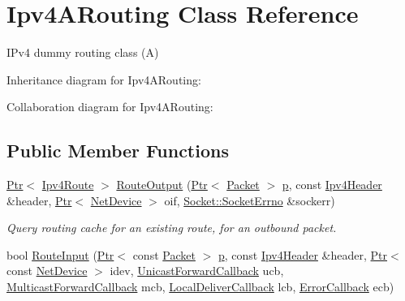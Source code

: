 \hypertarget{classIpv4ARouting}{}\section{Ipv4\+A\+Routing Class Reference}
\label{classIpv4ARouting}


I\+Pv4 dummy routing class (A)  




Inheritance diagram for Ipv4\+A\+Routing\+:


Collaboration diagram for Ipv4\+A\+Routing\+:
\subsection*{Public Member Functions}
\begin{DoxyCompactItemize}
\item 
\hyperlink{classns3_1_1Ptr}{Ptr}$<$ \hyperlink{classns3_1_1Ipv4Route}{Ipv4\+Route} $>$ \hyperlink{classIpv4ARouting_a13ea767139cc112214566ccb9862c412}{Route\+Output} (\hyperlink{classns3_1_1Ptr}{Ptr}$<$ \hyperlink{classns3_1_1Packet}{Packet} $>$ \hyperlink{lte__link__budget__x2__handover__measures_8m_ac9de518908a968428863f829398a4e62}{p}, const \hyperlink{classns3_1_1Ipv4Header}{Ipv4\+Header} \&header, \hyperlink{classns3_1_1Ptr}{Ptr}$<$ \hyperlink{classns3_1_1NetDevice}{Net\+Device} $>$ oif, \hyperlink{classns3_1_1Socket_ada1328c5ae0c28cb2a982caf8f6d6cca}{Socket\+::\+Socket\+Errno} \&sockerr)
\begin{DoxyCompactList}\small\item\em Query routing cache for an existing route, for an outbound packet. \end{DoxyCompactList}\item 
bool \hyperlink{classIpv4ARouting_a1cbe114fd34ed6681645ba469d52b8fe}{Route\+Input} (\hyperlink{classns3_1_1Ptr}{Ptr}$<$ const \hyperlink{classns3_1_1Packet}{Packet} $>$ \hyperlink{lte__link__budget__x2__handover__measures_8m_ac9de518908a968428863f829398a4e62}{p}, const \hyperlink{classns3_1_1Ipv4Header}{Ipv4\+Header} \&header, \hyperlink{classns3_1_1Ptr}{Ptr}$<$ const \hyperlink{classns3_1_1NetDevice}{Net\+Device} $>$ idev, \hyperlink{classns3_1_1Ipv4RoutingProtocol_a3453a85764cbbb1e704da7e919aa5d19}{Unicast\+Forward\+Callback} ucb, \hyperlink{classns3_1_1Ipv4RoutingProtocol_a26e76f7a555462e6c08fceda64a99d58}{Multicast\+Forward\+Callback} mcb, \hyperlink{classns3_1_1Ipv4RoutingProtocol_aa6ffa0159cb143daa3c46d2ba69bb1b9}{Local\+Deliver\+Callback} lcb, \hyperlink{classns3_1_1Ipv4RoutingProtocol_a0348285418c30d5021b08f7a68af21ea}{Error\+Callback} ecb)

\end{DoxyCompactItemize}

